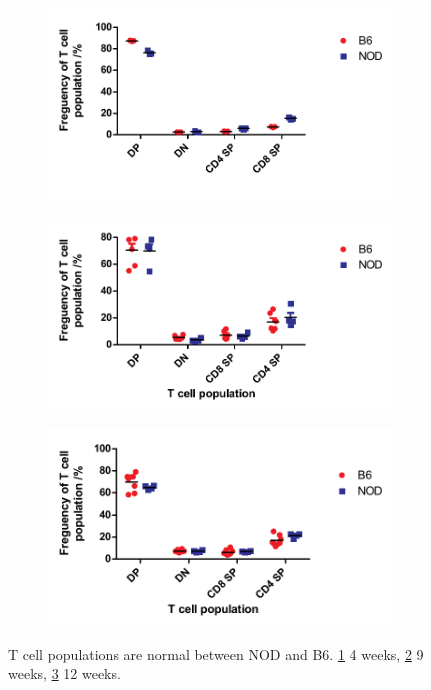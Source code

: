 \begin{figure}
	\begin{subfigure}{0.5\textwidth}
	\caption{}
	\includegraphics[width=\textwidth]{Figures/4wkThyTcells.pdf}
	\label{subfig:4wkThyTcells}
	\end{subfigure}
	\begin{subfigure}{0.5\textwidth}
	\caption{}
 	\includegraphics[width=\textwidth]{Figures/9wkThyTcells.pdf}
	\label{subfig:9wkThyTcells}
	\end{subfigure}
	\begin{subfigure}{0.5\textwidth}
	\centering
	\caption{}
 	\includegraphics[width=\textwidth]{Figures/12wkThyTcells.pdf}
	\label{subfig:12wkThyTcells}
	\end{subfigure}
\caption[T cell development is normal in the NOD mouse]{T cell populations are normal between NOD and B6. \ref{subfig:4wkThyTcells} 4 weeks, \ref{subfig:9wkThyTcells} 9 weeks, \ref{subfig:12wkThyTcells} 12 weeks.}
\label{fig:NODB6Tcells}
\end{figure}


